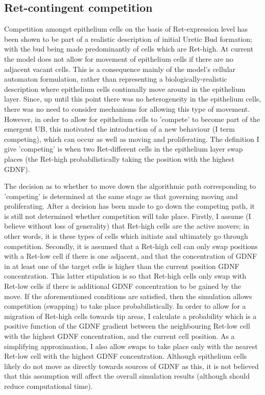 \documentclass[pdftex,10pt,a4paper]{article}
\begin{document}
\subsection{Ret-contingent competition}\label{sec:retcompetition}
Competition amongst epithelium cells on the basis of Ret-expression level has been shown to be part of a realistic description of initial Uretic Bud formation; with the bud being made predominantly of cells which are Ret-high. At current the model does not allow for movement of epithelium cells if there are no adjacent vacant cells. This is a consequence mainly of the model's cellular automaton formulation, rather than representing a biologically-realistic description where epithelium cells continually move around in the epithelium layer. Since, up until this point there was no heterogeneity in the epithelium cells, there was no need to consider mechanisms for allowing this type of movement. However, in order to allow for epithelium cells to 'compete' to become part of the emergent UB, this motivated the introduction of a new behaviour (I term competing), which can occur as well as moving and proliferating. The definition I give 'competing' is when two Ret-different cells in the epithelium layer swap places (the Ret-high probabilistically taking the position with the highest GDNF).

The decision as to whether to move down the algorithmic path corresponding to 'competing' is determined at the same stage as that governing moving and proliferating. After a decision has been made to go down the competing path, it is still not determined whether competition will take place. Firstly, I assume (I believe without loss of generality) that Ret-high cells are the active movers; in other words, it is these types of cells which initiate and ultimately go through competition. Secondly, it is assumed that a Ret-high cell can only swap positions with a Ret-low cell if there is one adjacent, and that the concentration of GDNF in at least one of the target cells is higher than the current position GDNF concentration. This latter stipulation is so that Ret-high cells only swap with Ret-low cells if there is additional GDNF concentration to be gained by the move. If the aforementioned conditions are satisfied, then the simulation allows competition (swapping) to take place probabilistically. In order to allow for a migration of Ret-high cells towards tip areas, I calculate a probability which is a positive function of the GDNF gradient between the neighbouring Ret-low cell with the highest GDNF concentration, and the current cell position. As a simplifying approximation, I also allow swaps to take place only with the nearest Ret-low cell with the highest GDNF concentration. Although epithelium cells likely do not move as directly towards sources of GDNF as this, it is not believed that this assumption will affect the overall simulation results (although should reduce computational time).
\end{document}
